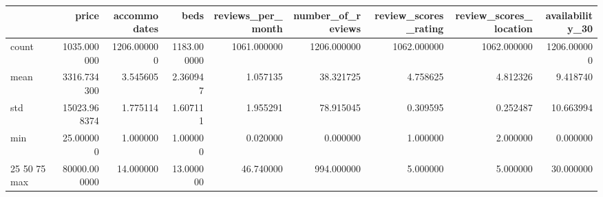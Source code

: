 \begin{tabular}{lrrrrrrrr}
\toprule
 & price & accommodates & beds & reviews_per_month & number_of_reviews & review_scores_rating & review_scores_location & availability_30 \\
\midrule
count & 1035.000000 & 1206.000000 & 1183.000000 & 1061.000000 & 1206.000000 & 1062.000000 & 1062.000000 & 1206.000000 \\
mean & 3316.734300 & 3.545605 & 2.360947 & 1.057135 & 38.321725 & 4.758625 & 4.812326 & 9.418740 \\
std & 15023.968374 & 1.775114 & 1.607111 & 1.955291 & 78.915045 & 0.309595 & 0.252487 & 10.663994 \\
min & 25.000000 & 1.000000 & 1.000000 & 0.020000 & 0.000000 & 1.000000 & 2.000000 & 0.000000 \\
25%
50%
75%
max & 80000.000000 & 14.000000 & 13.000000 & 46.740000 & 994.000000 & 5.000000 & 5.000000 & 30.000000 \\
\bottomrule
\end{tabular}
